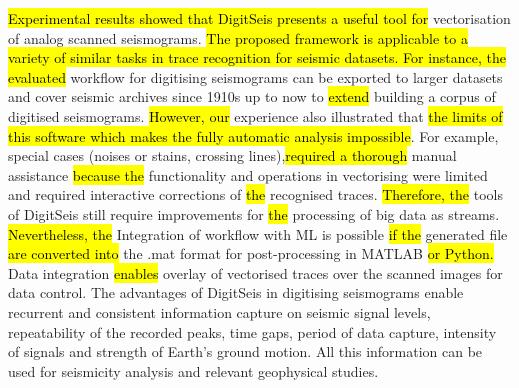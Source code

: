 \documentclass[sensors,article,submit,moreauthors,pdftex]{Definitions/mdpi}
\begin{document}
\hl{Experimental results showed that DigitSeis presents a useful tool for }vectorisation of analog scanned seismograms. \hl{The proposed framework is applicable to a variety of similar tasks in trace recognition for seismic datasets. For instance, the evaluated }workflow for digitising seismograms can be exported to larger datasets and cover seismic archives since 1910s up to now to \hl{extend} building a corpus of digitised seismograms. \hl{However, our }experience\hl{ }also illustrated that \hl{the limits of this software which makes the fully automatic analysis impossible}. For example,\hl{ }special cases (noises or stains, crossing lines),\hl{required a thorough }manual assistance\hl{ because the }functionality and operations in vectorising were limited and required interactive corrections of \hl{the }recognised traces. \hl{Therefore, the }tools of DigitSeis still require improvements for \hl{the }processing of big data as streams. \hl{Nevertheless, the }Integration of workflow with \ac{ML} is possible \hl{if the} generated file \hl{are converted into }the .mat format for post-processing in MATLAB \hl{or Python. }Data integration \hl{enables }overlay of vectorised traces over the scanned images for data control. The advantages of DigitSeis in digitising seismograms enable recurrent and consistent information capture on seismic signal levels, repeatability of the recorded peaks, time gaps, period of data capture, intensity of signals and strength of Earth's ground motion. All this information can be used for seismicity analysis and relevant geophysical studies. 

\vspace{6pt} 


\end{document}
